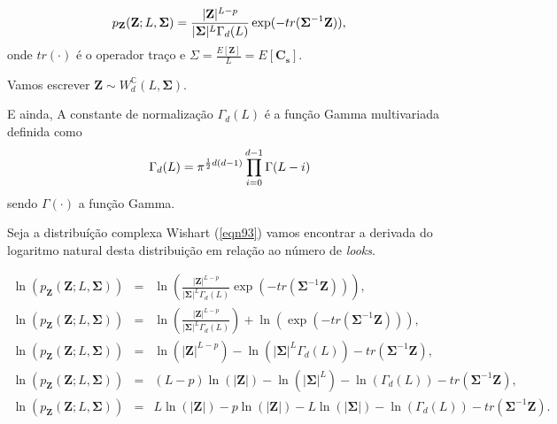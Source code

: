 \documentclass[12pt,a4paper]{article}
\begin{document}
\begin{equation}\label{eqn93}
	p_{\mathbf{Z}}(\mathbf{Z};L,\mathbf{\Sigma})=\frac{|\mathbf{Z}|^{L-p}}{|\mathbf{\Sigma}|^{L}\Gamma_d(L)} \exp(-tr(\mathbf{\Sigma}^{-1}\mathbf{Z})), \\
\end{equation}
onde $tr(\cdot)$ é o operador traço e ${\Sigma}=\frac{E[\mathbf{Z}]}{L}=E[\mathbf{C_{s}}]$. 

Vamos escrever $\mathbf{Z}\sim W_d^{\mathbb C}(L, \mathbf{\Sigma})$.

E ainda, A constante de normalização $\Gamma_d(L)$ é a função Gamma multivariada definida como 
\begin{equation}\label{eqn94}
	\Gamma_d(L)=\pi^{\frac{1}{2}d(d-1)} \prod_{i=0}^{d-1}\Gamma(L-i) \\
\end{equation}
sendo $\Gamma(\cdot)$ a função Gamma.

Seja a distribuíção complexa Wishart (\ref{eqn93}) vamos encontrar a derivada do logaritmo natural desta distribuição em relação ao número de {\it looks}.


\begin{equation}\label{eqn95}
\begin{array}{ccc}
	\ln{\left(p_{\mathbf{Z}}(\mathbf{Z};L,\mathbf{\Sigma})\right)}&=&\ln{\left(\frac{|\mathbf{Z}|^{L-p}}{|\mathbf{\Sigma}|^{L}\Gamma_d(L)} \exp(-tr(\mathbf{\Sigma}^{-1}\mathbf{Z}))\right)}, \\
	\ln{\left(p_{\mathbf{Z}}(\mathbf{Z};L,\mathbf{\Sigma})\right)}&=&\ln{\left(\frac{|\mathbf{Z}|^{L-p}}{|\mathbf{\Sigma}|^{L}\Gamma_d(L)}\right)}+\ln{\left( \exp(-tr(\mathbf{\Sigma}^{-1}\mathbf{Z}))\right)}, \\
	\ln{\left(p_{\mathbf{Z}}(\mathbf{Z};L,\mathbf{\Sigma})\right)}&=&\ln{\left(|\mathbf{Z}|^{L-p}\right)} - \ln{\left(|\mathbf{\Sigma}|^{L}\Gamma_d(L)\right)}-tr(\mathbf{\Sigma}^{-1}\mathbf{Z}), \\
	\ln{\left(p_{\mathbf{Z}}(\mathbf{Z};L,\mathbf{\Sigma})\right)}&=&(L-p)\ln{\left(|\mathbf{Z}|\right)} - \ln{\left(|\mathbf{\Sigma}|^{L}\right)}-\ln{\left(\Gamma_d(L)\right)}-tr(\mathbf{\Sigma}^{-1}\mathbf {Z}), \\
	\ln{\left(p_{\mathbf{Z}}(\mathbf{Z};L,\mathbf{\Sigma})\right)}&=&L\ln{\left(|\mathbf{Z}|\right)}-p\ln{\left(|\mathbf{Z}|\right)} - L\ln{\left(|\mathbf{\Sigma}|\right)}-\ln{\left(\Gamma_d(L)\right)}-tr(\mathbf{\Sigma}^{-1}\mathbf{Z}). \\
\end{array}
\end{equation}
\end{document}
